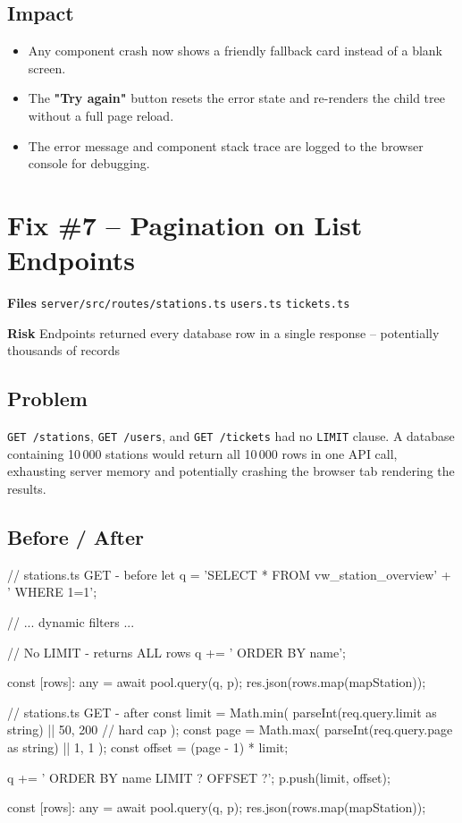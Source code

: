 \documentclass[12pt,a4paper]{report}
\newcommand{\diffL}{\noindent\begin{minipage}[t]{0.485\linewidth}}
\newcommand{\diffR}{\end{minipage}\hfill\begin{minipage}[t]{0.485\linewidth}}
\newcommand{\diffend}{\end{minipage}\par\smallskip}
\newcommand{\inforow}[2]{%
	\noindent
	\begin{tcolorbox}[
		colback   = lightblue,
		colframe  = midblue,
		arc       = 2pt,
		left      = 6pt, right = 6pt, top = 2pt, bottom = 2pt,
		sidebyside, sidebyside align = top seam,
		lefthand width = 3.2cm,
		segmentation hidden,
		]
		\textbf{\color{brandblue}\small #1}
		\tcblower
		{\small\color{labelgray} #2}
	\end{tcolorbox}\vspace{2pt}%
}
\newcommand{\file}[1]{\texttt{\small #1}}
\begin{document}
	\subsection*{Impact}
	\begin{itemize}
		\item Any component crash now shows a friendly fallback card instead of a blank screen.
		\item The \textbf{"Try again"} button resets the error state and re-renders the child tree without a full page reload.
		\item The error message and component stack trace are logged to the browser console for debugging.
	\end{itemize}
	
	\section{Fix \#7 -- Pagination on List Endpoints}
	
	\inforow{Files}{\file{server/src/routes/stations.ts} \quad \file{users.ts} \quad \file{tickets.ts}}
	\inforow{Risk}{Endpoints returned every database row in a single response -- potentially thousands of records}
	
	\subsection*{Problem}
	
	\texttt{GET /stations}, \texttt{GET /users}, and \texttt{GET /tickets} had no
	\texttt{LIMIT} clause. A database containing 10\,000 stations would return all
	10\,000 rows in one API call, exhausting server memory and potentially crashing
	the browser tab rendering the results.
	
	\subsection*{Before / After}
	
	\diffL
	\begin{beforecode}
		// stations.ts GET - before
		let q =
		'SELECT * FROM vw_station_overview'
		+ ' WHERE 1=1';
		
		// ... dynamic filters ...
		
		// No LIMIT - returns ALL rows
		q += ' ORDER BY name';
		
		const [rows]: any =
		await pool.query(q, p);
		res.json(rows.map(mapStation));
	\end{beforecode}
	\diffR
	\begin{aftercode}
		// stations.ts GET - after
		const limit = Math.min(
		parseInt(req.query.limit as string)
		|| 50,
		200  // hard cap
		);
		const page = Math.max(
		parseInt(req.query.page as string)
		|| 1,
		1
		);
		const offset = (page - 1) * limit;
		
		q += ' ORDER BY name LIMIT ? OFFSET ?';
		p.push(limit, offset);
		
		const [rows]: any =
		await pool.query(q, p);
		res.json(rows.map(mapStation));
	\end{aftercode}
	\diffend
	
\end{document}
